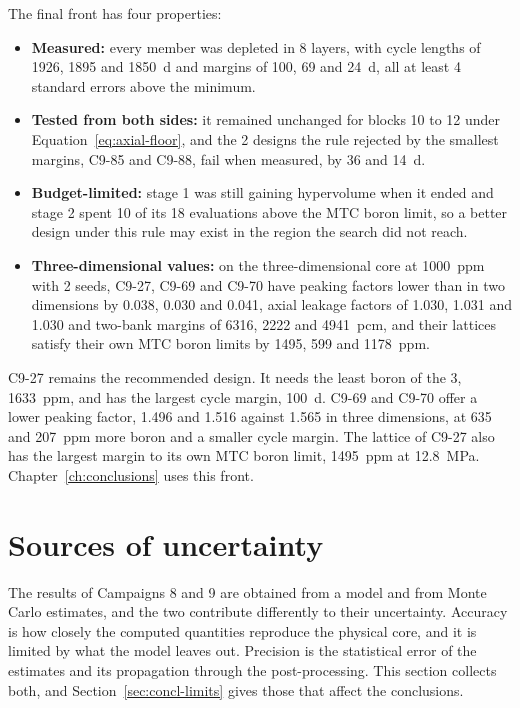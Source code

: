 The final front has four properties:

\begin{itemize}
  \item \textbf{Measured:} every member was depleted in 8 layers, with
        cycle lengths of 1926, 1895 and \SI{1850}{d} and margins of
        100, 69 and \SI{24}{d}, all at least 4 standard errors above
        the minimum.
  \item \textbf{Tested from both sides:} it remained unchanged for
        blocks 10 to 12 under Equation~\eqref{eq:axial-floor}, and the
        2 designs the rule rejected by the smallest margins, C9-85 and
        C9-88, fail when measured, by 36 and \SI{14}{d}.
  \item \textbf{Budget-limited:} stage 1 was still gaining hypervolume
        when it ended and stage 2 spent 10 of its 18 evaluations above
        the MTC boron limit, so a better design under this rule may
        exist in the region the search did not reach.
  \item \textbf{Three-dimensional values:} on the three-dimensional
        core at \SI{1000}{ppm} with 2 seeds, C9-27, C9-69 and C9-70 have
        peaking factors lower than in two dimensions by 0.038, 0.030 and
        0.041, axial leakage factors of 1.030, 1.031 and 1.030 and
        two-bank margins of 6316, 2222 and \SI{4941}{pcm}, and their
        lattices satisfy their own MTC boron limits by 1495, 599 and
        \SI{1178}{ppm}.
\end{itemize}

C9-27 remains the recommended design. It needs the least boron of the
3, \SI{1633}{ppm}, and has the largest cycle margin, \SI{100}{d}. C9-69
and C9-70 offer a lower peaking factor, 1.496 and 1.516 against 1.565
in three dimensions, at 635 and \SI{207}{ppm} more boron and a smaller
cycle margin. The lattice of C9-27 also has the largest margin to its
own MTC boron limit, \SI{1495}{ppm} at \SI{12.8}{MPa}.
Chapter~\ref{ch:conclusions} uses this front.

\section{Sources of uncertainty}
\label{sec:res-uncertainty}\label{sec:res-c9-limits}

The results of Campaigns 8 and 9 are obtained from a model and from Monte Carlo estimates, and the two contribute differently to their uncertainty.
Accuracy is how closely the computed quantities reproduce the physical
core, and it is limited by what the model leaves out. Precision is the
statistical error of the estimates and its propagation through the
post-processing. This section collects both, and Section~\ref{sec:concl-limits}
gives those that affect the conclusions.

